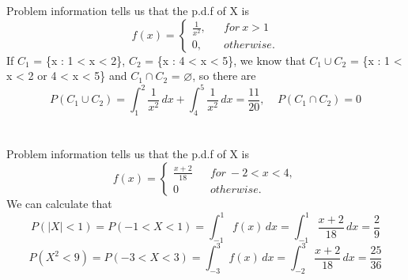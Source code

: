 \documentclass[10.5pt]{article}
\begin{document}
\section{}
Problem information tells us that the p.d.f of X is$$f(x) = \left\{
    \begin{array}{rcl}
        \frac{1}{x^2}, & & for~x > 1\\
        0, & & otherwise. 
    \end{array}\right.$$\indent
If $C_1$ = \{x : 1 < x < 2\}, $C_2$ = \{x : 4 < x < 5\}, we know that $C_1\cup C_2$ = \{x : 1 < x < 2 or 4 < x < 5\} and $C_1\cap C_2$ = $\varnothing $, so there are$$P(C_1\cup C_2) = \int_{1}^{2} \frac{1}{x^2} \,dx + \int_{4}^{5} \frac{1}{x^2} \,dx = \frac{11}{20},~~~~~ P(C_1\cap C_2) = 0$$

\section{}
Problem information tells us that the p.d.f of X is$$f(x) = \left\{
    \begin{array}{rcl}
        \frac{x+2}{18} & & for~-2 < x <4,\\
        0 & & otherwise. 
    \end{array}\right.$$\indent
We can calculate that$$P(\left\lvert X\right\rvert <1) = P(-1 < X < 1) = \int_{-1}^{1} f(x) \,dx = \int_{-1}^{1} \frac{x+2}{18} \,dx = \frac{2}{9}$$ $$P(X^2 < 9) = P(-3 < X < 3) = \int_{-3}^{3} f(x) \,dx = \int_{-2}^{3} \frac{x+2}{18} \,dx = \frac{25}{36}$$
\end{document}
